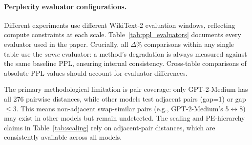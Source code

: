 \documentclass{article}
\newenvironment{tabhere}{%
  \par\medskip
  \begin{center}
}{%
  \end{center}
  \medskip
}
\begin{document}
\paragraph{Perplexity evaluator configurations.}
Different experiments use different WikiText-2 evaluation windows, reflecting compute constraints at each scale. Table~\ref{tab:ppl_evaluators} documents every evaluator used in the paper. Crucially, all $\Delta$\% comparisons within any single table use the \emph{same} evaluator: a method's degradation is always measured against the same baseline PPL, ensuring internal consistency. Cross-table comparisons of absolute PPL values should account for evaluator differences.

\begin{tabhere}
\label{tab:ppl_evaluators}
\end{tabhere}


\noindent The primary methodological limitation is pair coverage: only GPT-2-Medium has all 276 pairwise distances, while other models test adjacent pairs (gap=1) or gap$\leq$3. This means non-adjacent swap-similar pairs (e.g., GPT-2-Medium's 5$\leftrightarrow$8) may exist in other models but remain undetected. The scaling and PE-hierarchy claims in Table~\ref{tab:scaling} rely on adjacent-pair distances, which are consistently available across all models.
\end{document}
